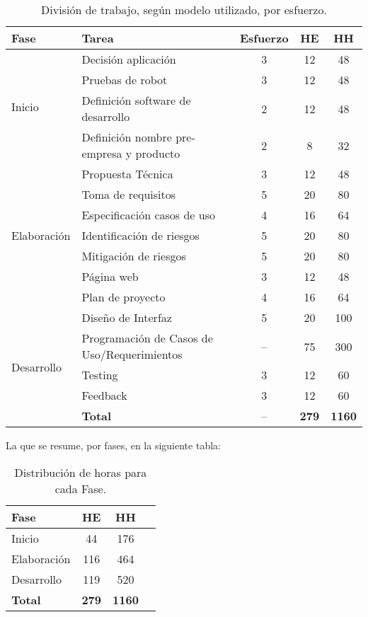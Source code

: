 \begin{table}[H]
  \centering
  \begin{tabular}{|l|m{5cm}|c|c|c|}\hline
    {\bf Fase} & {\bf Tarea} & {\bf Esfuerzo} & {\bf HE} & {\bf HH}\\\hline
    \multirow{4}{*}{Inicio} & Decisi\'on aplicaci\'on                & 3 & 12 & 48\\\cline{2-5}
           & Pruebas de robot                   & 3 & 12 & 48\\\cline{2-5}
           & Definici\'on software de desarrollo  & 2 & 12 & 48\\\cline{2-5}
           & Definici\'on nombre pre-empresa y producto & 2 & 8 & 32\\\hline
    \multirow{7}{*}{Elaboraci\'on} & Propuesta T\'ecnica           & 3 & 12 & 48\\\cline{2-5}
                & Toma de requisitos          & 5 & 20 & 80\\\cline{2-5}
                & Especificaci\'on casos de uso & 4 & 16 & 64\\\cline{2-5}
                & Identificaci\'on de riesgos   & 5 & 20 & 80\\\cline{2-5}
                & Mitigaci\'on de riesgos       & 5 & 20 & 80\\\cline{2-5}
                & P\'agina web                  & 3 & 12 & 48\\\cline{2-5}
                & Plan de proyecto            & 4 & 16 & 64\\\hline
    \multirow{5}{*}{Desarrollo} & Dise\~no de Interfaz                            & 5 & 20 & 100\\\cline{2-5}
               & Programaci\'on de Casos de Uso/Requerimientos   & -- & 75 & 300\\\cline{2-5}
               & Testing                                       & 3 & 12 & 60\\\cline{2-5}
               & Feedback                                      & 3 & 12 & 60\\\hline
                & {\bf Total}                 & -- & {\bf 279} & {\bf 1160}\\\hline
  \end{tabular}
  \label{tab:wbs}
  \caption[~Tabla WBS]{Divisi\'on de trabajo, seg\'un modelo utilizado, por esfuerzo.}
\end{table}


La que se resume, por fases, en la siguiente tabla:
\begin{table}[H]
\centering
\begin{tabular}{|l|c|c|c|}\hline
    {\bf Fase} & {\bf HE} & {\bf HH}\\\hline
    Inicio     & 44 & 176 \\\hline
    Elaboraci\'on & 116 & 464 \\\hline
    Desarrollo & 119 & 520 \\\hline
    {\bf Total} & {\bf 279} & {\bf 1160}\\\hline
\end{tabular}
\label{tab:fase}
\caption[~Distribuci\'on de horas para cada Fase]{Distribuci\'on de horas para cada Fase.}
\end{table}

